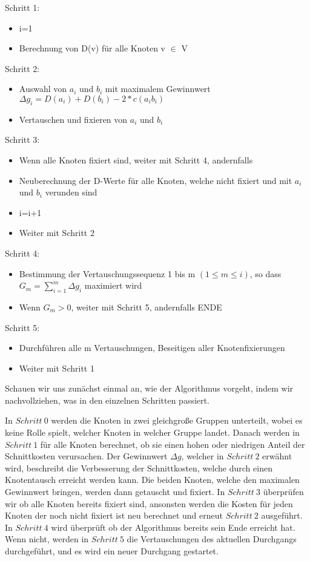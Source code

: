 Schritt 1:
\begin{itemize}
  \item i=1
  \item Berechnung von D(v) für alle Knoten v $\in$ V
\end{itemize}

Schritt 2:
\begin{itemize}
  \item Auswahl von $a_i$ und $b_i$ mit maximalem Gewinnwert $\Delta g_i =
  D(a_i) + D(b_i) - 2 * c(a_i b_i)$
  \item Vertauschen und fixieren von $a_i$ und $b_i$
\end{itemize}


Schritt 3:
\begin{itemize}
  \item Wenn alle Knoten fixiert sind, weiter mit Schritt 4, andernfalls
  \item Neuberechnung der D-Werte für alle Knoten, welche nicht fixiert und
  mit $a_i$ und $b_i$ verunden sind
  \item i=i+1
  \item Weiter mit Schritt 2
\end{itemize}

Schritt 4:
\begin{itemize}
  \item Bestimmung der Vertauschungssequenz 1 bis m $(1 \leq m \leq i)$, so dass
  $G_m = \sum_{i=1}^{m}{\Delta g_i}$ maximiert wird
  \item Wenn $G_m > 0$, weiter mit Schritt 5, andernfalls ENDE
\end{itemize}

Schritt 5:
\begin{itemize}
  \item Durchführen alle m Vertauschungen, Beseitigen aller Knotenfixierungen
  \item Weiter mit Schritt 1
\end{itemize}\vspace{10pt}

Schauen wir uns zunächst einmal an, wie der Algorithmus vorgeht, indem wir
nachvollziehen, was in den einzelnen Schritten passiert.\vspace{10pt}

In $Schritt\ 0$ werden die Knoten in zwei gleichgroße Gruppen unterteilt, wobei
es keine Rolle spielt, welcher Knoten in welcher Gruppe landet. Danach werden in
$Schritt\ 1$ für alle Knoten berechnet, ob sie einen hohen oder niedrigen Anteil
der Schnittkosten verursachen. Der Gewinnwert $\Delta g$, welcher in $Schritt\
2$ erwähnt wird, beschreibt die Verbesserung der Schnittkosten, welche durch
einen Knotentausch erreicht werden kann. Die beiden Knoten, welche den
maximalen Gewinnwert bringen, werden dann getauscht und fixiert. In $Schritt\ 3$
überprüfen wir ob alle Knoten bereits fixiert sind, ansonsten werden die Kosten
für jeden Knoten der noch nicht fixiert ist neu berechnet und erneut $Schritt\
2$ ausgeführt. In $Schritt\ 4$ wird überprüft ob der Algorithmus bereits sein
Ende erreicht hat. Wenn nicht, werden in $Schritt\ 5$ die Vertauschungen des
aktuellen Durchgangs durchgeführt, und es wird ein neuer Durchgang gestartet.\vspace{10pt}

